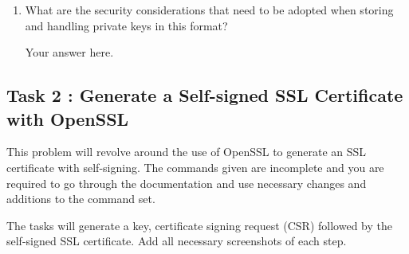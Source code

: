 \documentclass[11pt,letterpaper]{article}
\newenvironment{answer}{\em \color{blue} \begin{adjustwidth}{1cm}{1cm}}{\end{adjustwidth}}
\begin{document}
\begin{enumerate}
\begin{answer}
		Your answer here.
		
	\end{answer}
    \item What are the security considerations that need to be adopted when storing and handling private keys in this format?
    \begin{answer}
	
		Your answer here.
		
	\end{answer}

\end{enumerate}

\newpage
\subsection*{Task 2 : Generate a Self-signed SSL Certificate with OpenSSL}
%
This problem will revolve around the use of OpenSSL to generate an SSL certificate with self-signing. The commands given are incomplete and you are required to go through the documentation and use necessary changes and additions to the command set.

The tasks will generate a key, certificate signing request (CSR) followed by the self-signed SSL certificate. Add all necessary screenshots of each step. 
\end{document}
